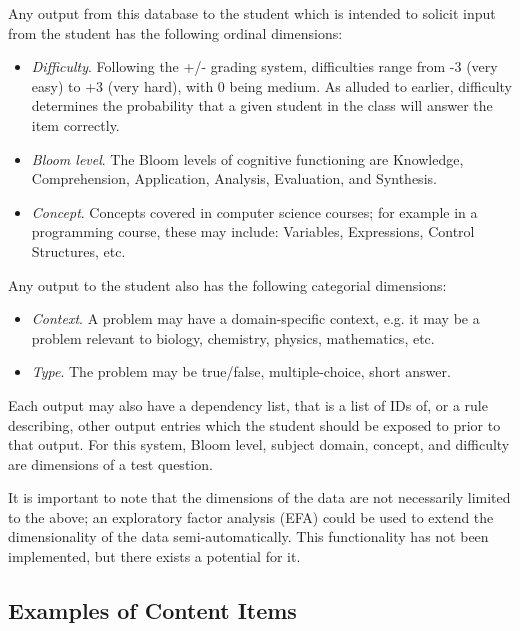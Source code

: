 Any output from this database to the student which is intended to solicit input
from the student has the following ordinal dimensions:

\begin{itemize}

  \item \emph{Difficulty}. Following the +/- grading system, difficulties range
  from -3 (very easy) to +3 (very hard), with 0 being medium. As alluded to
  earlier, difficulty determines the probability that a given student in the 
  class will answer the item correctly.

  \item \emph{Bloom level}.  The Bloom levels of cognitive functioning are
  Knowledge, Comprehension, Application, Analysis, Evaluation, and Synthesis.

  \item \emph{Concept}.  Concepts covered in computer science courses; for
  example in a programming course, these may include: Variables, Expressions,
  Control Structures, etc.

\end{itemize}

Any output to the student also has the following categorial dimensions:

\begin{itemize}

  \item \emph{Context}.  A problem may have a domain-specific context, e.g. it
  may be a problem relevant to biology, chemistry, physics, mathematics, etc.

  \item \emph{Type}.  The problem may be true/false, multiple-choice, short
  answer.

\end{itemize}

Each output may also have a dependency list, that is a list of IDs of, or a
rule describing, other output entries which the student should be exposed to
prior to that output.  For this system, Bloom level, subject domain, concept,
and difficulty are dimensions of a test question.  

It is important to note that the dimensions of the data are not necessarily
limited to the above; an exploratory factor analysis (EFA) could be used to
extend the dimensionality of the data semi-automatically.  This functionality
has not been implemented, but there exists a potential for it.

\subsection{Examples of Content Items}

